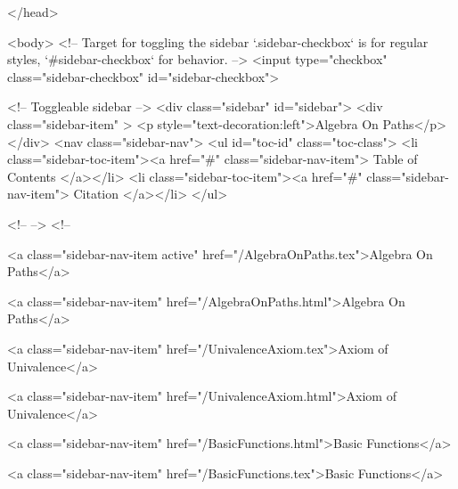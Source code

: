   
</head>




  <body>
    <!-- Target for toggling the sidebar `.sidebar-checkbox` is for regular
     styles, `#sidebar-checkbox` for behavior. -->
<input type="checkbox" class="sidebar-checkbox" id="sidebar-checkbox">

<!-- Toggleable sidebar -->
<div class="sidebar" id="sidebar">
  <div class="sidebar-item" >
    <p style="text-decoration:left">Algebra On Paths</p>
  </div>
  <nav class="sidebar-nav">
    <ul id="toc-id" class="toc-class">
  <li class="sidebar-toc-item"><a href="#" class="sidebar-nav-item"> Table of Contents </a></li>
  <li class="sidebar-toc-item"><a href="#" class="sidebar-nav-item"> Citation </a></li>
</ul>


    <!--  -->
    <!-- 
      
    
      
    
      
    
      
        
      
    
      
        
          <a class="sidebar-nav-item active" href="/AlgebraOnPaths.tex">Algebra On Paths</a>
        
      
    
      
        
          <a class="sidebar-nav-item" href="/AlgebraOnPaths.html">Algebra On Paths</a>
        
      
    
      
        
          <a class="sidebar-nav-item" href="/UnivalenceAxiom.tex">Axiom of Univalence</a>
        
      
    
      
        
          <a class="sidebar-nav-item" href="/UnivalenceAxiom.html">Axiom of Univalence</a>
        
      
    
      
        
          <a class="sidebar-nav-item" href="/BasicFunctions.html">Basic Functions</a>
        
      
    
      
        
          <a class="sidebar-nav-item" href="/BasicFunctions.tex">Basic Functions</a>
        
      
    
      
        
